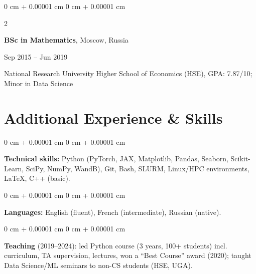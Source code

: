 \documentclass[10pt, letterpaper]{article}
\newenvironment{highlights}{
    \begin{itemize}[
        topsep=0.10 cm,
        parsep=0.10 cm,
        partopsep=0pt,
        itemsep=0pt,
        leftmargin=0 cm + 10pt
    ]
}{
    \end{itemize}
} %
\newenvironment{onecolentry}{
    \begin{adjustwidth}{
        0 cm + 0.00001 cm
    }{
        0 cm + 0.00001 cm
    }
}{
    \end{adjustwidth}
} %
\newenvironment{twocolentry}[2][]{
    \onecolentry
    \def\secondColumn{#2}
    \setcolumnwidth{\fill, 4.5 cm}
    \begin{paracol}{2}
}{
    \switchcolumn \raggedleft \secondColumn
    \end{paracol}
    \endonecolentry
} %
\let\hrefWithoutArrow\href
\begin{document}
        \begin{twocolentry}{Sep 2015 -- Jun 2019}
            \textbf{BSc in Mathematics}, Moscow, Russia
        \end{twocolentry}
            National Research University Higher School of Economics (HSE), GPA: 7.87/10; Minor in Data Science


    \section{Additional Experience \& Skills}
        \begin{onecolentry}
            \textbf{Technical skills:} Python (PyTorch, JAX, Matplotlib, Pandas, Seaborn, Scikit-Learn, SciPy, NumPy, WandB), Git, Bash, SLURM, Linux/HPC environments,  \LaTeX, C{+\!+} (basic).
        \end{onecolentry}

        \vspace{0.09 cm}

        \begin{onecolentry}
            \textbf{Languages:} English (fluent), French (intermediate), Russian (native). 
        \end{onecolentry}

        \vspace{0.09 cm}

        \begin{onecolentry}
            \textbf{Teaching} (2019--2024): led Python course (3 years, 100+ students) incl. curriculum, TA supervision, lectures, won a ``Best Course'' award (2020); taught Data Science/ML seminars to non-CS students (HSE, UGA).
        \end{onecolentry}

        \vspace{0.09 cm}
\end{document}
